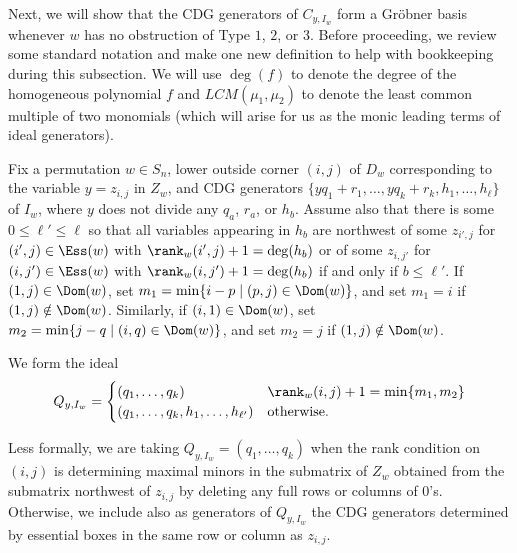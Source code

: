 Next, we will show that the CDG generators of $C_{y,I_w}$ form a Gr\"obner basis whenever $w$ has no obstruction of Type $1$, $2$, or $3$.  Before proceeding, we review some standard notation and make one new definition to help with bookkeeping during this subsection.  We will use $\deg(f)$ to denote the degree of the homogeneous polynomial $f$ and $LCM(\mu_1,\mu_2)$ to denote the least common multiple of two monomials (which will arise for us as the monic leading terms of ideal generators).  

\begin{definition}\label{def:Qdef}
Fix a permutation $w \in S_n$, lower outside corner $(i,j)$ of $D_w$ corresponding to the variable $y = z_{i,j}$ in $Z_w$, and CDG generators $\{yq_1+r_1, \ldots, yq_k+r_k, h_1, \ldots, h_\ell \}$ of $I_w$, where $y$ does not divide any $q_a$, $r_a$, or $h_b$.  Assume also that there is some $0 \leq \ell' \leq \ell$ so that all variables appearing in $h_b$ are northwest of some $z_{i',j}$ for $(i',j) \in \Ess(w)$ with $\rank_w(i',j) +1= \deg(h_b)$ or of some $z_{i,j'}$ for $(i,j') \in \Ess(w)$ with $\rank_w(i,j') +1= \deg(h_b)$ if and only if $b \leq \ell'$.  If $(1,j) \in \Dom(w)$, set $m_1 = \min\{i-p \mid (p,j) \in \Dom(w)\}$, and set $m_1 = i$ if $(1,j) \notin \Dom(w)$.  Similarly, if $(i,1) \in \Dom(w)$, set $m_2 = \min\{j-q \mid (i,q) \in \Dom(w)\}$, and set $m_2 = j$ if $(1,j) \notin \Dom(w)$. 

We form the ideal \[ Q_{y,I_w} = \begin{cases} 
      (q_1, \ldots, q_k) & \rank_w(i,j)+1 = \min\{m_1,m_2\} \\
     (q_1, \ldots, q_k, h_1, \ldots, h_{\ell'}) & \mbox{otherwise}. \\
   \end{cases}
\]
\end{definition}

Less formally, we are taking $Q_{y,I_w} = (q_1, \ldots, q_k)$ when the rank condition on $(i,j)$ is determining maximal minors in the submatrix of $Z_w$ obtained from the submatrix northwest of $z_{i,j}$ by deleting any full rows or columns of $0$'s.  Otherwise, we include also as generators of $Q_{y,I_w}$ the CDG generators determined by essential boxes in the same row or column as $z_{i,j}$.  

